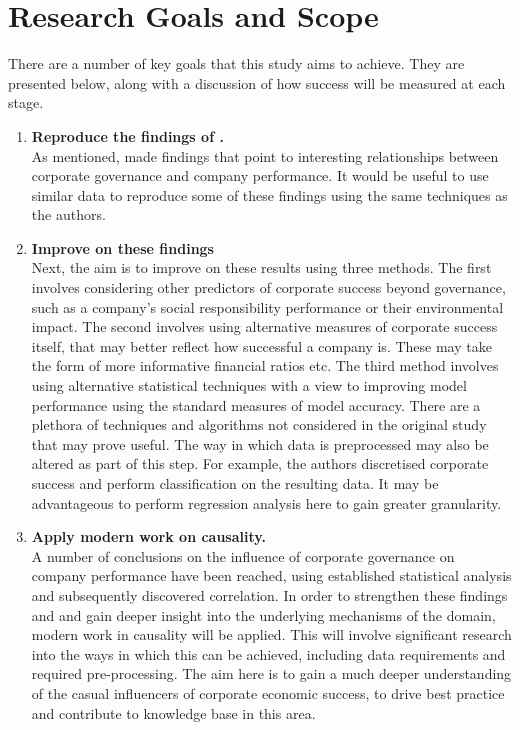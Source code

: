 \section{Research Goals and Scope}{\label{RGAS}}
{There are a number of key goals that this study aims to achieve. They are presented below, along with a discussion of how success will be measured at each stage.
\begin{enumerate}
\item{\bf {Reproduce the findings of \cite{moldovan2015learning}}.}\\
{As mentioned, \cite{moldovan2015learning} made findings that point to interesting relationships between corporate governance and company performance. It would be useful to use similar data to reproduce some of these findings using the same techniques as the authors.}
\item{\bf {Improve on these findings}}\\
Next, the aim is to improve on these results using three methods. The first involves considering other predictors of corporate success beyond governance, such as a company's social responsibility performance or their environmental impact. The second involves using alternative measures of corporate success itself, that may better reflect how successful a company is. These may take the form of more informative financial ratios etc. The third method involves using alternative statistical techniques with a view to improving model performance using the standard measures of model accuracy. There are a plethora of techniques and algorithms not considered in the original study that may prove useful. The way in which data is preprocessed may also be altered as part of this step. For example, the authors discretised corporate success and perform classification on the resulting data. It may be advantageous to perform regression analysis here to gain greater granularity.
\item{\bf {Apply modern work on causality.}}\\
{A number of conclusions on the influence of corporate governance on company performance have been reached, using established statistical analysis and subsequently discovered correlation. In order to strengthen these findings and and gain deeper insight into the underlying mechanisms of the domain, modern work in causality will be applied. This will involve significant research into the ways in which this can be achieved, including data requirements and required pre-processing. The aim here is to gain a much deeper understanding of the casual influencers of corporate economic success, to drive best practice and contribute to knowledge base in this area. }
\end{enumerate}
}
